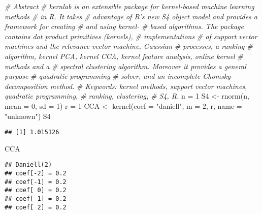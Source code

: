 \documentclass[
]{article}
\newenvironment{Shaded}{\begin{snugshade}}{\end{snugshade}}
\newcommand{\AttributeTok}[1]{\textcolor[rgb]{0.77,0.63,0.00}{#1}}
\newcommand{\CommentTok}[1]{\textcolor[rgb]{0.56,0.35,0.01}{\textit{#1}}}
\newcommand{\DecValTok}[1]{\textcolor[rgb]{0.00,0.00,0.81}{#1}}
\newcommand{\FunctionTok}[1]{\textcolor[rgb]{0.00,0.00,0.00}{#1}}
\newcommand{\NormalTok}[1]{#1}
\newcommand{\OtherTok}[1]{\textcolor[rgb]{0.56,0.35,0.01}{#1}}
\newcommand{\StringTok}[1]{\textcolor[rgb]{0.31,0.60,0.02}{#1}}
\begin{document}
\begin{Shaded}
\begin{Highlighting}[]
\CommentTok{\# Abstract}
\CommentTok{\# kernlab is an extensible package for kernel{-}based machine learning methods }
\CommentTok{\# in R. It takes}
\CommentTok{\# advantage of R’s new S4 object model and provides a framework for creating }
\CommentTok{\# and using kernel{-}}
\CommentTok{\# based algorithms. The package contains dot product primitives (kernels), }
\CommentTok{\# implementations}
\CommentTok{\# of support vector machines and the relevance vector machine, Gaussian }
\CommentTok{\# processes, a ranking}
\CommentTok{\# algorithm, kernel PCA, kernel CCA, kernel feature analysis, online kernel }
\CommentTok{\# methods and a}
\CommentTok{\# spectral clustering algorithm. Moreover it provides a general purpose }
\CommentTok{\# quadratic programming}
\CommentTok{\# solver, and an incomplete Chomsky decomposition method.}
\CommentTok{\# Keywords: kernel methods, support vector machines, quadratic programming, }
\CommentTok{\# ranking, clustering,}
\CommentTok{\# S4, R.}
\NormalTok{n }\OtherTok{=} \DecValTok{1}
\NormalTok{S4 }\OtherTok{\textless{}{-}} \FunctionTok{rnorm}\NormalTok{(n, }\AttributeTok{mean =} \DecValTok{0}\NormalTok{, }\AttributeTok{sd =} \DecValTok{1}\NormalTok{)}
\NormalTok{r }\OtherTok{=} \DecValTok{1}
\NormalTok{CCA }\OtherTok{\textless{}{-}} \FunctionTok{kernel}\NormalTok{(}\AttributeTok{coef =} \StringTok{"daniell"}\NormalTok{, }\AttributeTok{m =} \DecValTok{2}\NormalTok{, r, }\AttributeTok{name =} \StringTok{"unknown"}\NormalTok{)}
\NormalTok{S4}
\end{Highlighting}
\end{Shaded}

\begin{verbatim}
## [1] 1.015126
\end{verbatim}

\begin{Shaded}
\begin{Highlighting}[]
\NormalTok{CCA}
\end{Highlighting}
\end{Shaded}

\begin{verbatim}
## Daniell(2) 
## coef[-2] = 0.2
## coef[-1] = 0.2
## coef[ 0] = 0.2
## coef[ 1] = 0.2
## coef[ 2] = 0.2
\end{verbatim}
\end{document}
